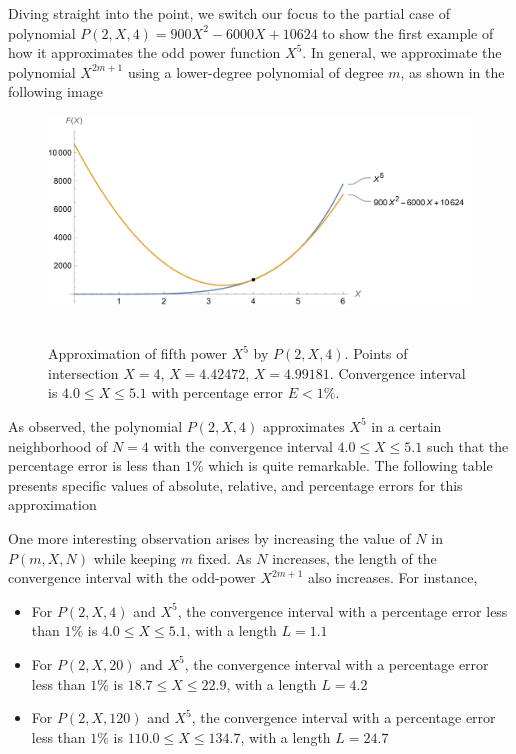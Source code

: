 Diving straight into the point, we switch our focus to the partial case of polynomial
$P(2,X,4) = 900X^2 - 6000X + 10624$
to show the first example of how it approximates the odd power function $X^5$.
In general, we approximate the polynomial $X^{2m+1}$ using a lower-degree polynomial of degree $m$,
as shown in the following image
\begin{figure}[H]
    \centering
    \includegraphics[width=1\textwidth]{sections/images/03_plots_polynomial_p2_n4_with_fifth}
    ~\caption{Approximation of fifth power $X^5$ by $P(2, X, 4)$.
    Points of intersection $X=4$, $X=4.42472$, $X=4.99181$.
    Convergence interval is $4.0 \leq X \leq 5.1$ with percentage error $E < 1\%$.
    }\label{fig:03_plots_polynomial_p2_n4_with_fifth}
\end{figure}
As observed, the polynomial $P(2, X, 4)$ approximates $X^5$ in a certain neighborhood of $N=4$ with
the convergence interval $4.0 \leq X \leq 5.1$ such that the percentage error is less than $1\%$ which is quite remarkable.
The following table presents specific values of absolute, relative, and percentage errors for this approximation


One more interesting observation arises by increasing the value of $N$ in $P(m, X, N)$ while keeping $m$ fixed.
As $N$ increases, the length of the convergence interval with the odd-power $X^{2m+1}$ also increases.
For instance,
\begin{itemize}
    \item For $P(2, X, 4)$ and $X^5$, the convergence interval with a percentage error less than $1\%$ is $4.0 \leq X \leq 5.1$, with a length $L=1.1$
    \item For $P(2, X, 20)$ and $X^5$, the convergence interval with a percentage error less than $1\%$ is $18.7 \leq X \leq 22.9$, with a length $L=4.2$
    \item For $P(2, X, 120)$ and $X^5$, the convergence interval with a percentage error less than $1\%$ is $110.0 \leq X \leq 134.7$, with a length $L=24.7$
\end{itemize}

